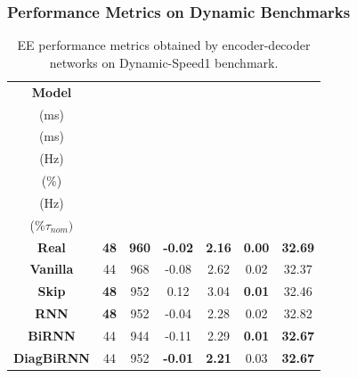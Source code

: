 \documentclass{beamer}
\begin{document}
\begin{frame}
\frametitle{Performance Metrics on Dynamic Benchmarks}

\begin{table}[ht!]
    \centering
    \begin{tabular}{c c c c c c c}
        \toprule
          \textbf{Model} &   \shortstack{\boldmath{$t_{2\%}$} \\ (ms)} & \shortstack{\boldmath{$t_{95\%}$} \\ (ms)} & \shortstack{\boldmath{$E_{fol}$} \\ (Hz)} & \shortstack{\boldmath{$D\%$} \\ (\%)} & \shortstack{\boldmath{$E_{ss}$} \\ (Hz)} & \shortstack{\boldmath{$\Delta \tau_{max}$} \\ ($\%\tau_{nom})$} \\
         \midrule

\textbf{Real} & \textbf{48} & \textbf{960} & \textbf{-0.02} & \textbf{2.16} & \textbf{0.00} & \textbf{32.69} \\
\midrule
\textbf{Vanilla} & \leavevmode\color{good}44 & \leavevmode\color{good}968 & \leavevmode\color{good}-0.08 & 2.62 & \leavevmode\color{good}0.02 & 32.37 \\
\textbf{Skip} & \leavevmode\color{good}\textbf{48} & \leavevmode\color{good}952 & 0.12 & \leavevmode\color{bad}3.04 & \leavevmode\color{good}\textbf{0.01} & 32.46 \\
\textbf{RNN} & \leavevmode\color{good}\textbf{48} & \leavevmode\color{good}952 & \leavevmode\color{good}-0.04 & \leavevmode\color{good}2.28 & \leavevmode\color{good}0.02 & \leavevmode\color{good}32.82 \\
\textbf{BiRNN} & \leavevmode\color{good}44 & 944 & \leavevmode\color{good}-0.11 & \leavevmode\color{good}2.29 & \leavevmode\color{good}\textbf{0.01} & \leavevmode\color{good}\textbf{32.67} \\
\textbf{DiagBiRNN} & \leavevmode\color{good}44 & \leavevmode\color{good}952 & \leavevmode\color{good}\textbf{-0.01} & \leavevmode\color{good}\textbf{2.21} & \leavevmode\color{good}0.03 & \leavevmode\color{good}\textbf{32.67} \\
         \bottomrule
    \end{tabular}
    \caption{EE performance metrics obtained by encoder-decoder networks on Dynamic-Speed1 benchmark.}
    \label{tab:dynamicspeed1}
    \vspace{-1em}
\end{table}


\end{frame}
\end{document}
